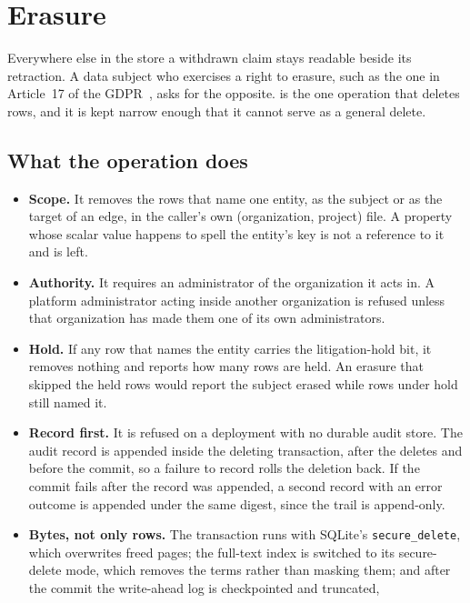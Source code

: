 \section{Erasure}
\label{sec:erasure}

Everywhere else in the store a withdrawn claim stays readable beside its
retraction. A data subject who exercises a right to erasure, such as the one in
Article~17 of the GDPR~\cite{gdpr}, asks for the opposite.  is the one
operation that deletes rows, and it is kept narrow enough that it cannot serve as
a general delete.

\subsection{What the operation does}

\shipped{}
\begin{itemize}[leftmargin=*,itemsep=2pt]
\item \textbf{Scope.} It removes the rows that name one entity, as the subject or
  as the target of an edge, in the caller's own (organization, project) file. A
  property whose scalar value happens to spell the entity's key is not a
  reference to it and is left.
\item \textbf{Authority.} It requires an administrator of the organization it
  acts in. A platform administrator acting inside another organization is
  refused unless that organization has made them one of its own administrators.
\item \textbf{Hold.} If any row that names the entity carries the litigation-hold
  bit, it removes nothing and reports how many rows are held. An erasure that
  skipped the held rows would report the subject erased while rows under hold
  still named it.
\item \textbf{Record first.} It is refused on a deployment with no durable audit
  store. The audit record is appended inside the deleting transaction, after the
  deletes and before the commit, so a failure to record rolls the deletion back.
  If the commit fails after the record was appended, a second record with an
  error outcome is appended under the same digest, since the trail is append-only.
\item \textbf{Bytes, not only rows.} The transaction runs with SQLite's
  \texttt{secure\_delete}, which overwrites freed pages; the full-text index is
  switched to its secure-delete mode, which removes the terms rather than masking
  them; and after the commit the write-ahead log is checkpointed and truncated,

\end{itemize}
